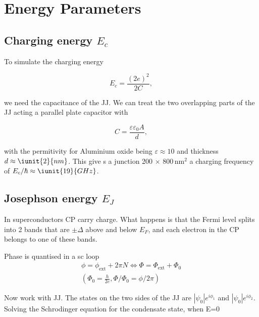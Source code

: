 \section{Energy Parameters\label{app:energy_parameters}}
\subsection{Charging energy $ E_c $}
To simulate the charging energy

 \begin{equation}\label{eqn:sim_1}
   E_c = \frac{(2e)^2}{2C},
 \end{equation}

 \noindent  we need  the capacitance  of the  JJ. We  can treat  the two
 overlapping parts of the JJ acting a parallel plate capacitor with

 \begin{framed}\noindent
   \begin{equation}\label{key} C =
     \frac{\varepsilon\varepsilon_0A}{d},
   \end{equation}

   \noindent   with   the   permitivity  for   Aluminium   oxide   being
   $ \varepsilon  \approx 10  $ and  thickness $  d \approx  \iunit{2}{nm} $.   This give  s a
   junction   200  $   \times   $  800\,nm$^2$   a   charging  frequency   of
   $ E_c/\hbar \approx\iunit{19}{GHz} $.
 \end{framed}

 \subsection{Josephson energy $ E_J $}
 In  superconductors CP  carry charge.  What happens  is that  the Fermi
 level splits into  2 bands that are $\pm\Delta$ above  and below $E_F$,
 and each electron in the CP belongs to one of these bands.


 {{ Phase is quantised in a sc loop
     \begin{equation}
       \begin{aligned}
         \phi =  \phi_\text{ext} + 2\pi  N \Leftrightarrow  \Phi = \Phi_\text{ext}  + \Phi_0
         \\(\Phi_0 = \frac{h}{2e}, \Phi/\Phi_0=\phi/2\pi)
       \end{aligned}
     \end{equation}
   }}

 Now  work  with  JJ.  The  states  on the  two  sides  of  the  JJ  are
 $\left|\psi_0\right|e^{i\phi_1}$                                    and
 $\left|\psi_0\right|e^{i\phi_2}$. Solving the  Schrodinger equation for
 the condensate state, when E=0

